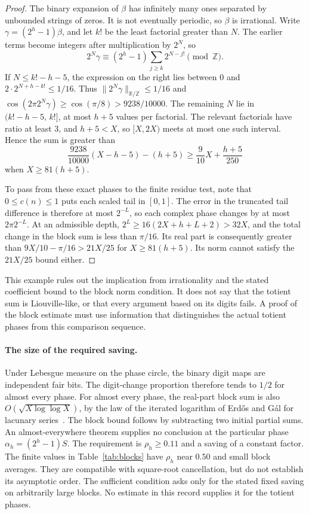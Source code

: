 \documentclass[11pt]{article}
\theoremstyle{plain}
\theoremstyle{definition}
\theoremstyle{remark}
\begin{document}
\begin{proof}
The binary expansion of $\beta$ has infinitely many ones separated by
unbounded strings of zeros. It is not eventually periodic, so $\beta$ is
irrational. Write $\gamma=(2^h-1)\beta$, and let $k!$ be the least
factorial greater than $N$. The earlier terms become integers after
multiplication by $2^N$, so
\[
 2^N\gamma\equiv(2^h-1)\sum_{j\ge k}2^{N-j!}\pmod{\mathbb Z}.
\]
If $N\le k!-h-5$, the expression on the right lies between $0$ and
$2\cdot2^{N+h-k!}\le1/16$. Thus $\|2^N\gamma\|_{\mathbb R/\mathbb Z}\le1/16$ and
$\cos(2\pi 2^{N}\gamma)\ge\cos(\pi/8)>9238/10000$. The remaining $N$
lie in $(k!-h-5,\,k!]$, at most $h+5$ values per factorial. The relevant
factorials have ratio at least $3$, and $h+5<X$, so $[X,2X)$ meets at
most one such interval. Hence the sum is greater than
\[
 \frac{9238}{10000}(X-h-5)-(h+5)\ge\frac9{10}X+\frac{h+5}{250}
\]
when $X\ge81(h+5)$.

To pass from these exact phases to the finite residue test, note that
$0\le c(n)\le1$ puts each scaled tail in $[0,1]$. The error in the
truncated tail difference is therefore at most $2^{-L}$, so each complex
phase changes by at most $2\pi2^{-L}$. At an admissible depth,
$2^L\ge16(2X+h+L+2)>32X$, and the total change in the block sum is less
than $\pi/16$. Its real part is consequently greater than
$9X/10-\pi/16>21X/25$ for $X\ge81(h+5)$. Its norm cannot satisfy the
$21X/25$ bound either.
\end{proof}

\noindent
This example rules out the implication from irrationality and the stated
coefficient bound to the block norm condition. It does not say that the
totient sum is Liouville-like, or that every argument based on its digits
fails. A proof of the block estimate must use information that distinguishes
the actual totient phases from this comparison sequence.

\paragraph{The size of the required saving.}
Under Lebesgue measure on the phase circle, the binary digit maps are
independent fair bits. The digit-change proportion therefore tends to
$1/2$ for almost every phase. For almost every phase, the real-part block
sum is also $O(\sqrt{X\log\log X})$, by the law of the iterated logarithm of
Erd\H{o}s and G\'al for lacunary series~\cite[p.~65]{erdos-gal}.
The block bound follows by subtracting two initial partial sums.
An almost-everywhere theorem supplies no conclusion at the particular
phase $\alpha_h=(2^h-1)S$. The requirement is $\rho_h\ge 0.11$ and a saving of a constant
factor. The finite values in Table~\ref{tab:blocks} have $\rho_h$ near $0.50$
and small block averages. They are compatible with square-root
cancellation, but do not establish its asymptotic order. The sufficient
condition asks only for the stated fixed saving on arbitrarily large
blocks. No estimate in this record supplies it for the totient phases.
\end{document}
